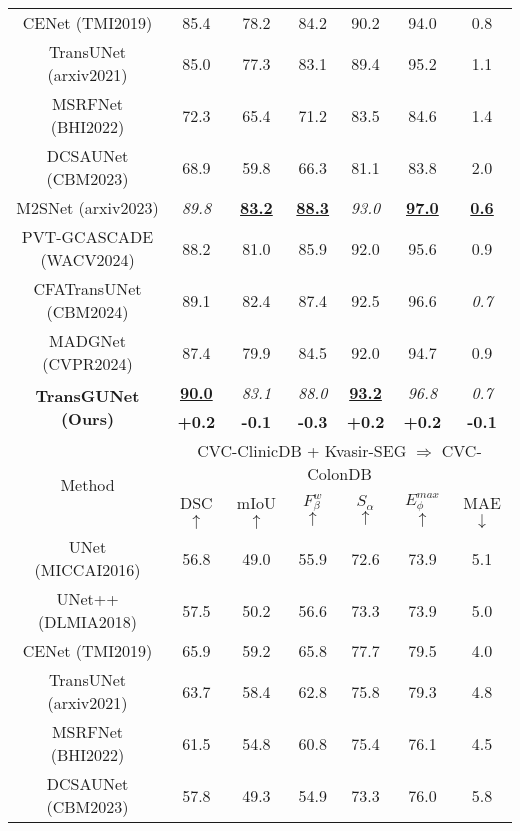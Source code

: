 \begin{table}[h]
\begin{tabular}{c|cccccc}
     CENet \tiny{(TMI2019)}         & 85.4 & 78.2 & 84.2 & 90.2 & 94.0 & 0.8 \\
     TransUNet \tiny{(arxiv2021)}   & 85.0 & 77.3 & 83.1 & 89.4 & 95.2 & 1.1 \\
     MSRFNet \tiny{(BHI2022)}       & 72.3 & 65.4 & 71.2 & 83.5 & 84.6 & 1.4 \\
     DCSAUNet \tiny{(CBM2023)}      & 68.9 & 59.8 & 66.3 & 81.1 & 83.8 & 2.0 \\
     M2SNet \tiny{(arxiv2023)}      & \textit{89.8} & \textbf{\underline{83.2}} & \textbf{\underline{88.3}} & \textit{93.0} & \textbf{\underline{97.0}} & \textbf{\underline{0.6}} \\
     PVT-GCASCADE \tiny{(WACV2024)} & 88.2 & 81.0 & 85.9 & 92.0 & 95.6 & 0.9 \\
     CFATransUNet \tiny{(CBM2024)}  & 89.1 & 82.4 & 87.4 & 92.5 & 96.6 & \textit{0.7} \\
     MADGNet \tiny{(CVPR2024)}      & 87.4 & 79.9 & 84.5 & 92.0 & 94.7 & 0.9 \\
     \hline
     \multicolumn{1}{c|}{\multirow{2}{*}{\textbf{TransGUNet \tiny{(Ours)}}}}     & \textbf{\underline{90.0}} & \textit{83.1} & \textit{88.0} & \textbf{\underline{93.2}} & \textit{96.8} & \textit{0.7} \\ \cline{2-7}
     & \textbf{+0.2} & \textbf{-0.1} & \textbf{-0.3} & \textbf{+0.2} & \textbf{+0.2} & \textbf{-0.1} \\
    \hline
    \multicolumn{1}{c|}{\multirow{2}{*}{Method}} & \multicolumn{6}{c}{CVC-ClinicDB + Kvasir-SEG $\Rightarrow$ CVC-ColonDB} \\ \cline{2-7}
    & DSC \scriptsize{$\uparrow$} & mIoU \scriptsize{$\uparrow$} & $F_{\beta}^{w}$ \scriptsize{$\uparrow$}  & $S_{\alpha}$ \scriptsize{$\uparrow$} & $E_{\phi}^{max}$ \scriptsize{$\uparrow$} & MAE \scriptsize{$\downarrow$} \\
    \hline
     UNet \tiny{(MICCAI2016)}       & 56.8 & 49.0 & 55.9 & 72.6 & 73.9 & 5.1 \\
     UNet++ \tiny{(DLMIA2018)}      & 57.5 & 50.2 & 56.6 & 73.3 & 73.9 & 5.0 \\
     CENet \tiny{(TMI2019)}         & 65.9 & 59.2 & 65.8 & 77.7 & 79.5 & 4.0 \\
     TransUNet \tiny{(arxiv2021)}   & 63.7 & 58.4 & 62.8 & 75.8 & 79.3 & 4.8 \\
     MSRFNet \tiny{(BHI2022)}       & 61.5 & 54.8 & 60.8 & 75.4 & 76.1 & 4.5 \\
     DCSAUNet \tiny{(CBM2023)}      & 57.8 & 49.3 & 54.9 & 73.3 & 76.0 & 5.8 \\

\end{tabular}
\end{table}
